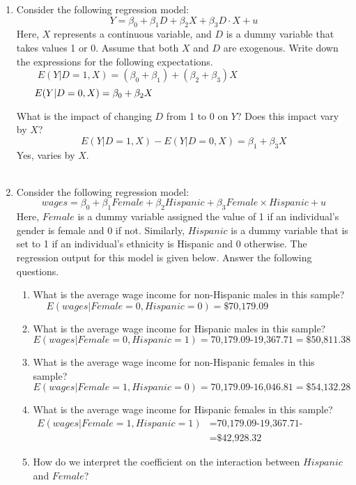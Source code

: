 \documentclass{./../../Latex/handout}
\begin{document}
\thispagestyle{plain}
\vspace{-1em}

\begin{enumerate}
\item Consider the following regression model:
$$ Y = \beta_0 + \beta_1 D + \beta_2 X + \beta_3  D\cdot X + u $$
Here, \( X \) represents a continuous variable, and \( D \) is a dummy variable that takes values 1 or 0. Assume that both $X$ and $D$ are exogenous. Write down the expressions for the following expectations.
$$ E(Y|D=1, X) =  (\beta_0 + \beta_1) + (\beta_2+\beta_3) X \hspace{4cm} $$
$$ E(Y|D=0, X) = \beta_0 + \beta_2  X \hspace{6.5cm}  $$ 

What is the impact of changing $D$ from 1 to 0 on $Y$? Does this impact vary by $X$?
$$ E(Y|D=1, X)-E(Y|D=0, X) = \beta_1 + \beta_3 X $$
Yes, varies by $X$. \\~\\
\item Consider the following regression model:$$ wages = \beta_0 + \beta_1 Female + \beta_2 Hispanic + \beta_3 Female \times Hispanic +  u  $$
Here, \(Female\) is a dummy variable assigned the value of 1 if an individual's gender is female and 0 if not. Similarly, \(Hispanic\) is a dummy variable that is set to 1 if an individual's ethnicity is Hispanic and 0 otherwise. The regression output for this model is given below. Answer the following questions.

\begin{table}
\centering
		
\end{table}

\newpage
\begin{enumerate}
	\item What is the average wage income for non-Hispanic males in this sample?
	$$ E(wages |Female = 0, Hispanic = 0)  = \text{\$70,179.09} \hspace{3cm} $$
	\item What is the average wage income for Hispanic males in this sample? 	
	$$ E(wages |Female = 0, Hispanic = 1)  = \text{70,179.09-19,367.71} = \text{\$50,811.38}  \hspace{1cm} $$
	 \item What is the average wage income for non-Hispanic females in this sample?	$$ E(wages |Female = 1, Hispanic = 0)  = \text{70,179.09-16,046.81} = \text{\$54,132.28}  \hspace{1cm} $$
	\item What is the average wage income for Hispanic females in this sample?
	\begin{align*}
		E(wages |Female = 1, Hispanic = 1)  &= \text{70,179.09-19,367.71-16,046.81+8,163.75} \\ &= \text{\$42,928.32} 
	\end{align*} 	
	\newpage
	\item How do we interpret the coefficient on the interaction between $Hispanic$ and $Female$?
	

\end{enumerate}
\end{enumerate}
\end{document}

